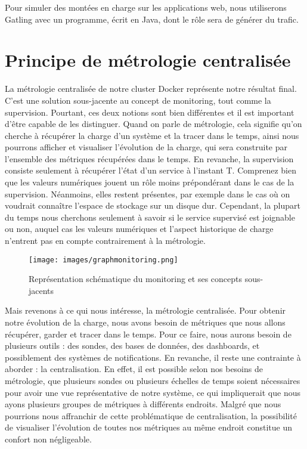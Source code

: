 \documentclass[oneside,12pt]{report}
\begin{document}
Pour simuler des montées en charge sur les applications web, nous utiliserons Gatling avec un programme, écrit en Java, dont le rôle sera de générer du trafic.


\section{Principe de métrologie centralisée}

\hspace{3ex}La métrologie centralisée de notre cluster Docker représente notre résultat final. C'est une solution sous-jacente au concept de monitoring, tout comme la supervision. Pourtant, ces deux notions sont bien différentes et il est important d'être capable de les distinguer. Quand on parle de métrologie, cela signifie qu'on cherche à récupérer la charge d'un système et la tracer dans le temps, ainsi nous pourrons afficher et visualiser l'évolution de la charge, qui sera construite par l'ensemble des métriques récupérées dans le temps. En revanche, la supervision consiste seulement à récupérer l'état d'un service à l'instant T. Comprenez bien que les valeurs numériques jouent un rôle moins prépondérant dans le cas de la supervision. Néanmoins, elles restent présentes, par exemple dans le cas où on voudrait connaître l'espace de stockage sur un disque dur. Cependant, la plupart du temps nous cherchons seulement à savoir si le service supervisé est joignable ou non, auquel cas les valeurs numériques et l'aspect historique de charge n'entrent pas en compte contrairement à la métrologie.

\begin{figure}[!ht]
    \centering
    \texttt{[image: images/graphmonitoring.png]}
    \caption{Représentation schématique du monitoring et ses concepts sous-jacents}
    \label{fig:mesh1}
\end{figure}

Mais revenons à ce qui nous intéresse, la métrologie centralisée. Pour obtenir notre évolution de la charge, nous avons besoin de métriques que nous allons récupérer, garder et tracer dans le temps. Pour ce faire, nous aurons besoin de plusieurs outils : des sondes, des bases de données, des dashboards, et possiblement des systèmes de notifications. En revanche, il reste une contrainte à aborder : la centralisation. En effet, il est possible selon nos besoins de métrologie, que plusieurs sondes ou plusieurs échelles de temps soient nécessaires pour avoir une vue représentative de notre système, ce qui impliquerait que nous ayons plusieurs groupes de métriques à différents endroits. Malgré que nous pourrions nous affranchir de cette problématique de centralisation, la possibilité de visualiser l'évolution de toutes nos métriques au même endroit constitue un confort non négligeable. 
\end{document}
